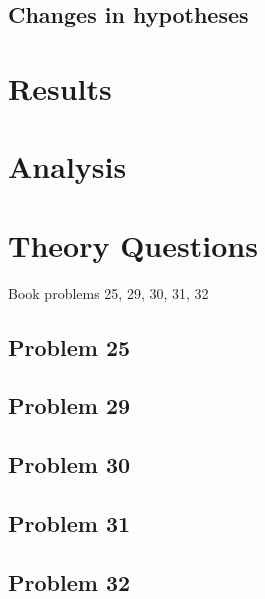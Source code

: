 \documentclass[]{article}
\begin{document}
\subsection{Changes in hypotheses}

\section{Results}

\section{Analysis}


\section{Theory Questions}
Book problems 25, 29, 30, 31, 32

\subsection{Problem 25}

\subsection{Problem 29}

\subsection{Problem 30}

\subsection{Problem 31}

\subsection{Problem 32}
	
	
\end{document}
